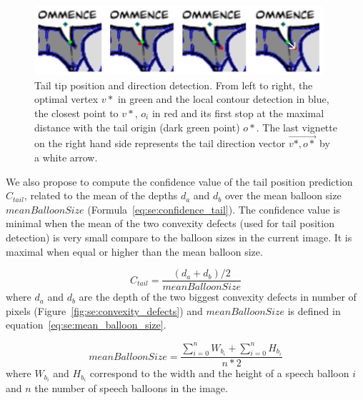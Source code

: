     \begin{figure}[ht]%
      \centering
      \includegraphics[width=0.95\textwidth]{tail_refinement.png}
    \caption[Tail tip position and direction detection]{Tail tip position and direction detection. From left to right, the optimal vertex $v*$ in green and the local contour detection in blue, the closest point to $v*$, $o_i$ in red and its first stop at the maximal distance with the tail origin (dark green point) $o*$. The last vignette on the right hand side represents the tail direction vector $\overrightarrow{v*,o*}$ by a white arrow.}
    \label{fig:se:tail_tip_refinement}
    \end{figure}

We also propose to compute the confidence value of the tail position prediction $C_{tail}$, related to the mean of the depths $d_a$ and $d_b$ over the mean balloon size $meanBalloonSize$ (Formula~\ref{eq:se:confidence_tail}).
The confidence value is minimal when the mean of the two convexity defects (used for tail position detection) is very small compare to the balloon sizes in the current image.
It is maximal when equal or higher than the mean balloon size.

\begin{equation}
\label{eq:se:confidence_tail}
  C_{tail} = \frac{(d_a+d_b)/2}{meanBalloonSize}
\end{equation}
where $d_a$ and $d_b$ are the depth of the two biggest convexity defects in number of pixels (Figure~\ref{fig:se:convexity_defects}) and $meanBalloonSize$ is defined in equation~\ref{eq:se:mean_balloon_size}.

\begin{equation}
  \label{eq:se:mean_balloon_size}
  meanBalloonSize = \frac{\sum\limits_{i=0}^n W_{b_i} + \sum\limits_{i=0}^n H_{b_i}}{n * 2}  
\end{equation}
where $W_{b_i}$ and $H_{b_i}$ correspond to the width and the height of a speech  balloon $i$ and $n$ the number of speech balloons in the image.

